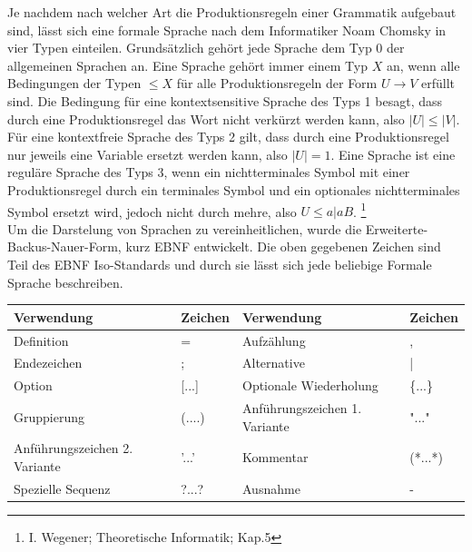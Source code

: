\documentclass[12pt, a4paper]{scrartcl}
\begin{document}
Je nachdem nach welcher Art die Produktionsregeln einer Grammatik aufgebaut sind, lässt sich eine formale Sprache nach dem Informatiker Noam Chomsky in vier Typen einteilen. Grundsätzlich gehört jede Sprache dem Typ 0 der allgemeinen Sprachen an. Eine Sprache gehört immer einem Typ $X$ an, wenn alle Bedingungen  der Typen $\leq X$ für alle Produktionsregeln der Form $U \rightarrow V$ erfüllt sind. Die Bedingung für eine kontextsensitive Sprache des Typs 1 besagt, dass durch eine Produktionsregel das Wort nicht verkürzt werden kann, also $|U| \leq |V|$. Für eine kontextfreie Sprache des Typs 2 gilt, dass durch eine Produktionsregel nur jeweils eine Variable ersetzt werden kann, also $|U| = 1$. Eine Sprache ist eine reguläre Sprache des Typs 3, wenn ein nichtterminales Symbol mit einer Produktionsregel durch ein terminales Symbol und ein optionales nichtterminales Symbol ersetzt wird, jedoch nicht durch mehre, also $U \leq a|aB$. \footnote{I. Wegener;	Theoretische Informatik; Kap.5}\\
Um die Darstelung von Sprachen zu vereinheitlichen, wurde die Erweiterte-Backus-Nauer-Form, kurz EBNF entwickelt. Die oben gegebenen Zeichen sind Teil des EBNF Iso-Standards und durch sie lässt sich jede beliebige Formale Sprache beschreiben.\\
\begin{table}[]
\begin{tabular}{|ll|ll|}
\hline
Verwendung                    & Zeichen   & Verwendung                    & Zeichen \\ \hline
Definition                    & =         & Aufzählung                    & ,       \\
Endezeichen                   & ;         & Alternative                   & |       \\
Option                        & {[}...{]} & Optionale Wiederholung        & \{...\} \\
Gruppierung                   & (....)    & Anführungszeichen 1. Variante & "..."   \\
Anführungszeichen 2. Variante & '...'     & Kommentar                      & (*...*) \\
Spezielle Sequenz             & ?...?     & Ausnahme                      & -       \\ \hline
\end{tabular}
\end{table}
 
\end{document}

